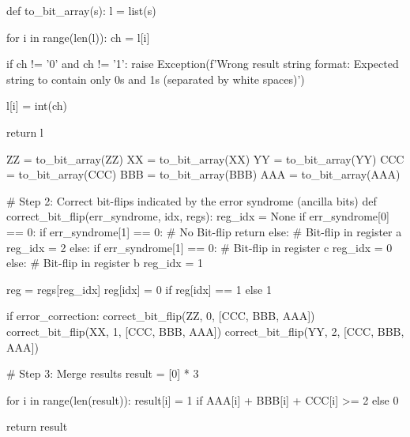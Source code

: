 \begin{python}
    def to_bit_array(s):
        l = list(s)

        for i in range(len(l)):
            ch = l[i]

            if ch != '0' and ch != '1':
                raise Exception(f'Wrong result string format: Expected string to contain only 0s and 1s (separated by white spaces)')

            l[i] = int(ch)

        return l


    ZZ = to_bit_array(ZZ)
    XX = to_bit_array(XX)
    YY = to_bit_array(YY)
    CCC = to_bit_array(CCC)
    BBB = to_bit_array(BBB)
    AAA = to_bit_array(AAA)

    # Step 2: Correct bit-flips indicated by the error syndrome (ancilla bits)
    def correct_bit_flip(err_syndrome, idx, regs):
        reg_idx = None
        if err_syndrome[0] == 0:
            if err_syndrome[1] == 0: # No Bit-flip
                return
            else: # Bit-flip in register a
                reg_idx = 2
        else:
            if err_syndrome[1] == 0: # Bit-flip in register c
                reg_idx = 0
            else: # Bit-flip in register b
                reg_idx = 1

        reg = regs[reg_idx]
        reg[idx] = 0 if reg[idx] == 1 else 1

    if error_correction:
        correct_bit_flip(ZZ, 0, [CCC, BBB, AAA])
        correct_bit_flip(XX, 1, [CCC, BBB, AAA])
        correct_bit_flip(YY, 2, [CCC, BBB, AAA])

    # Step 3: Merge results
    result = [0] * 3

    for i in range(len(result)):
        result[i] = 1 if AAA[i] + BBB[i] + CCC[i] >= 2 else 0

    return result
\end{python}
